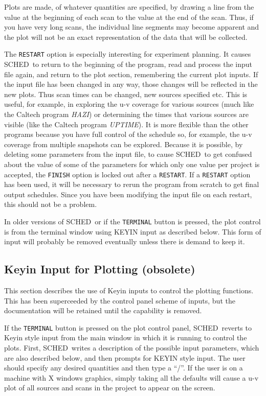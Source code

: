 \documentclass{report}
\newcommand{\schedb}{{\sc SCHED~}}
\begin{document}
Plots are made, of whatever quantities are specified, by drawing
a line from the value at the beginning of each scan to the value
at the end of the scan.  Thus, if you have very long scans, the
individual line segments may become apparent and the plot will not
be an exact representation of the data that will be collected.

The {\tt RESTART} option is especially interesting for experiment
planning.  It causes \schedb to return to the beginning of the
program, read and process the input file again, and return to the plot
section, remembering the current plot inputs.  If the input file has
been changed in any way, those changes will be reflected in the new
plots.  Thus scan times can be changed, new sources specified etc.
This is useful, for example, in exploring the u-v coverage for various
sources (much like the Caltech program {\sl HAZI}) or determining the
times that various sources are visible (like the Caltech program {\sl
UPTIME}).  It is more flexible than the other programs because you
have full control of the schedule so, for example, the u-v coverage
from multiple snapshots can be explored.  Because it is possible, by
deleting some parameters from the input file, to cause \schedb to get
confused about the value of some of the parameters for which only one
value per project is accepted, the {\tt FINISH} option is locked out
after a {\tt RESTART}.  If a {\tt RESTART} option has been used, it
will be necessary to rerun the program from scratch to get final
output schedules.  Since you have been modifying the input file on
each restart, this should not be a problem.

In older versions of \schedb or if the {\tt TERMINAL} button is pressed,
the plot control is from the terminal window using KEYIN input as
described below.  This form of input will probably be removed eventually
unless there is demand to keep it.

\subsection{Keyin Input for Plotting (obsolete)}

This section describes the use of Keyin inputs to control the plotting
functions.  This has been superceeded by the control panel scheme
of inputs, but the documentation will be retained until the capability
is removed.

If the {\tt TERMINAL} button is pressed on the plot control panel,
\schedb reverts to Keyin style input from the main window in which it
is running to control the plots.  First, \schedb writes a description
of the possible input parameters, which are also described below, and
then prompts for KEYIN style input.  The user should specify any
desired quantities and then type a ``/''.  If the user is on a machine
with X windows graphics, simply taking all the defaults will cause a
u-v plot of all sources and scans in the project to appear on the
screen.
\end{document}
